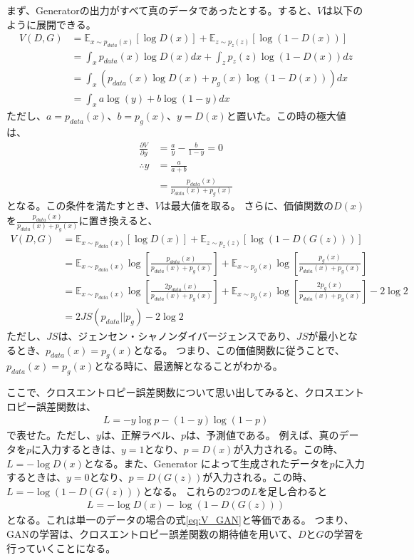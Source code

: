 \documentclass{ltjsarticle}
\begin{document}
まず、Generatorの出力がすべて真のデータであったとする。すると、$V$は以下のように展開できる。
\begin{align}
  V(D, G) &= \mathbb{E}_{x \sim p_{data}(x)}[\log D(x)] + \mathbb{E}_{z \sim p_z(z)}[\log(1 - D(x))]\\
  &= \int_x p_{data}(x) \log D(x) dx + \int_z p_z(z) \log(1 - D(x)) dz\\
  &= \int_x \left( p_{data}{(x)} \log D(x) + p_g(x) \log(1 - D(x)) \right) dx\\
  &= \int_x a\log(y) + b\log(1 - y) dx
\end{align}
ただし、$a = p_{data}(x)$、$b = p_g(x)$、$y = D(x)$と置いた。この時の極大値は、
\begin{align}
  \frac{\partial V}{\partial y} &= \frac{a}{y} - \frac{b}{1 - y} = 0\\
  \therefore y &= \frac{a}{a + b} \\
  &= \frac{p_{data}(x)}{p_{data}(x) + p_g(x)}
\end{align}
となる。この条件を満たすとき、$V$は最大値を取る。
さらに、価値関数の$D(x)$を$\frac{p_{data}(x)}{p_{data}(x) + p_g(x)}$に置き換えると、
\begin{align}
  V(D, G) &= \mathbb{E}_{x \sim p_{data}(x)}[\log D(x)] + \mathbb{E}_{z \sim p_z(z)}[\log(1 - D(G(z)))]\\
  &= \mathbb{E}_{x \sim p_{data}(x)}\log\left[ \frac{p_{data}(x)}{p_{data}(x) + p_g(x)} \right] + \mathbb{E}_{x \sim p_g(x)}\log\left[ \frac{p_g(x)}{p_{data}(x) + p_g(x)} \right]\\
  &= \mathbb{E}_{x \sim p_{data}(x)}\log\left[ \frac{2p_{data}(x)}{p_{data}(x) + p_g(x)} \right] + \mathbb{E}_{x \sim p_g(x)}\log\left[ \frac{2p_g(x)}{p_{data}(x) + p_g(x)} \right] - 2\log 2\\
  &= 2JS(p_{data}||p_g) - 2\log 2
\end{align}
ただし、$JS$は、ジェンセン・シャノンダイバージェンスであり、$JS$が最小となるとき、$p_{data}(x) = p_g(x)$となる。
つまり、この価値関数に従うことで、$p_{data}(x)= p_g(x)$となる時に、最適解となることがわかる。
\par
ここで、クロスエントロピー誤差関数について思い出してみると、クロスエントロピー誤差関数は、
\begin{align}
  L = -y \log p - (1 - y) \log (1 - p)
\end{align}
で表せた。ただし、$y$は、正解ラベル、$p$は、予測値である。
例えば、真のデータを$p$に入力するときは、$y = 1$となり、$p = D(x)$が入力される。この時、$L = -\log D(x)$となる。また、Generator によって生成されたデータを$p$に入力するときは、$y = 0$となり、$p = D(G(z))$が入力される。この時、$L = -\log(1 - D(G(z)))$となる。
これらの2つの$L$を足し合わると
\begin{align}
  L = -\log D(x) - \log(1 - D(G(z)))
\end{align}
となる。これは単一のデータの場合の式\eqref{eq:V_GAN}と等価である。
つまり、GANの学習は、クロスエントロピー誤差関数の期待値を用いて、$D$と$G$の学習を行っていくことになる。
\end{document}
